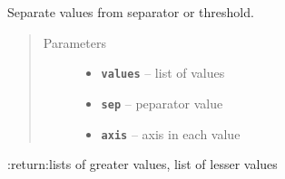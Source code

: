 \documentclass[letterpaper,10pt,english]{sphinxmanual}
\begin{document}

\begin{fulllineitems}
\label{RRtoolbox.lib:RRtoolbox.lib.image.separe}
Separate values from separator or threshold.
\begin{quote}\begin{description}
\item[{Parameters}] \leavevmode\begin{itemize}
\item {} 
\textbf{\texttt{values}} -- list of values

\item {} 
\textbf{\texttt{sep}} -- peparator value

\item {} 
\textbf{\texttt{axis}} -- axis in each value

\end{itemize}

\end{description}\end{quote}

:return:lists of greater values, list of lesser values

\end{fulllineitems}


\begin{fulllineitems}
\label{RRtoolbox.lib:RRtoolbox.lib.image.str2np}
\end{fulllineitems}


\begin{fulllineitems}
\label{RRtoolbox.lib:RRtoolbox.lib.image.transposeIm}
\end{fulllineitems}

\end{document}
